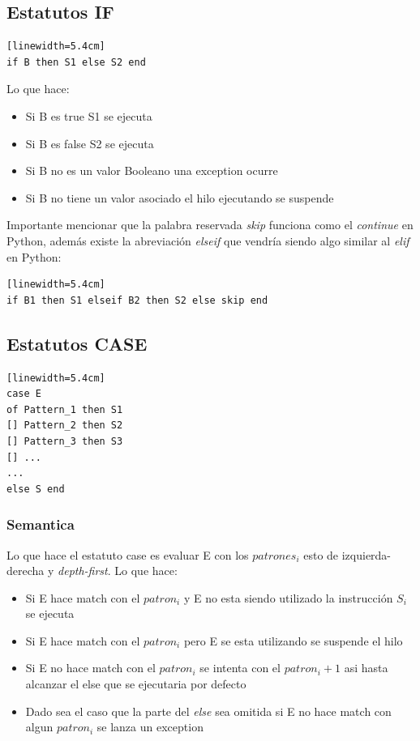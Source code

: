 \documentclass[10pt,journal,compsoc]{IEEEtran}
\begin{document}
\subsection{Estatutos IF}
\begin{lstlisting}[language=Oz, caption = {Variables en un scope}][linewidth=5.4cm]
if B then S1 else S2 end
\end{lstlisting}
Lo que hace:
\begin{itemize}
	\item Si B es true S1 se ejecuta
	\item Si B es false S2 se ejecuta
	\item Si B no es un valor Booleano una exception ocurre
	\item Si B no tiene un valor asociado el hilo ejecutando se suspende 
\end{itemize}
Importante mencionar que la palabra reservada \emph{skip} funciona como el \emph{continue} en Python, adem\'as existe la abreviaci\'on \emph{elseif} que vendr\'ia siendo algo similar al \emph{elif} en Python:
\begin{lstlisting}[language=Oz, caption = {Variables en un scope}][linewidth=5.4cm]
if B1 then S1 elseif B2 then S2 else skip end
\end{lstlisting}

\subsection{Estatutos CASE}
\begin{lstlisting}[language=Oz, caption = {Variables en un scope}][linewidth=5.4cm]
case E 
of Pattern_1 then S1 
[] Pattern_2 then S2 
[] Pattern_3 then S3
[] ...
...
else S end
\end{lstlisting}
\subsubsection{Semantica}
Lo que hace el estatuto case es evaluar E con los $patrones_i$ esto de izquierda-derecha y \emph{depth-first}. Lo que hace:
\begin{itemize}
	\item Si E hace match con el $patron_i$ y E no esta siendo utilizado la instrucci\'on $S_i$ se ejecuta
	\item Si E hace match con el $patron_i$ pero E se esta utilizando se suspende el hilo
	\item Si E no hace match con el $patron_i$ se intenta con el $patron_i+1$ asi hasta alcanzar el else que se ejecutaria por defecto
	\item Dado sea el caso que la parte del \emph{else} sea omitida si E no hace match con algun $patron_i$ se lanza un exception
\end{itemize}
\end{document}
